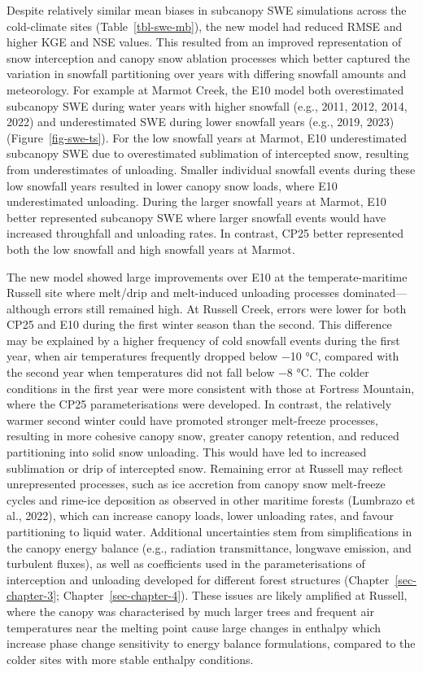 \documentclass[
  letterpaper,
]{tex/uofsthesis-cs}
\begin{document}
Despite relatively similar mean biases in subcanopy SWE simulations
across the cold-climate sites (Table~\ref{tbl-swe-mb}), the new model
had reduced RMSE and higher KGE and NSE values. This resulted from an
improved representation of snow interception and canopy snow ablation
processes which better captured the variation in snowfall partitioning
over years with differing snowfall amounts and meteorology. For example
at Marmot Creek, the E10 model both overestimated subcanopy SWE during
water years with higher snowfall (e.g., 2011, 2012, 2014, 2022) and
underestimated SWE during lower snowfall years (e.g., 2019, 2023)
(Figure~\ref{fig-swe-ts}). For the low snowfall years at Marmot, E10
underestimated subcanopy SWE due to overestimated sublimation of
intercepted snow, resulting from underestimates of unloading. Smaller
individual snowfall events during these low snowfall years resulted in
lower canopy snow loads, where E10 underestimated unloading. During the
larger snowfall years at Marmot, E10 better represented subcanopy SWE
where larger snowfall events would have increased throughfall and
unloading rates. In contrast, CP25 better represented both the low
snowfall and high snowfall years at Marmot.

The new model showed large improvements over E10 at the
temperate-maritime Russell site where melt/drip and melt-induced
unloading processes dominated---although errors still remained high. At
Russell Creek, errors were lower for both CP25 and E10 during the first
winter season than the second. This difference may be explained by a
higher frequency of cold snowfall events during the first year, when air
temperatures frequently dropped below −10 °C, compared with the second
year when temperatures did not fall below −8 °C. The colder conditions
in the first year were more consistent with those at Fortress Mountain,
where the CP25 parameterisations were developed. In contrast, the
relatively warmer second winter could have promoted stronger melt-freeze
processes, resulting in more cohesive canopy snow, greater canopy
retention, and reduced partitioning into solid snow unloading. This
would have led to increased sublimation or drip of intercepted snow.
Remaining error at Russell may reflect unrepresented processes, such as
ice accretion from canopy snow melt-freeze cycles and rime-ice
deposition as observed in other maritime forests (Lumbrazo et al.,
2022), which can increase canopy loads, lower unloading rates, and
favour partitioning to liquid water. Additional uncertainties stem from
simplifications in the canopy energy balance (e.g., radiation
transmittance, longwave emission, and turbulent fluxes), as well as
coefficients used in the parameterisations of interception and unloading
developed for different forest structures (Chapter~\ref{sec-chapter-3};
Chapter~\ref{sec-chapter-4}). These issues are likely amplified at
Russell, where the canopy was characterised by much larger trees and
frequent air temperatures near the melting point cause large changes in
enthalpy which increase phase change sensitivity to energy balance
formulations, compared to the colder sites with more stable enthalpy
conditions.
\end{document}
